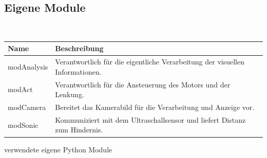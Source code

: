   \subsection{Eigene Module}
  \ \\
  \begin{minipage}{\columnwidth}
    \makeatletter
    \def\@captype{table}
    \makeatother
    \centering
    \begin{tabular}{p{3.5cm}|p{11cm}}
    Name & Beschreibung \\ \hline \hline
    modAnalysis & Verantwortlich für die eigentliche Verarbeitung der visuellen
      Informationen. \\
    modAct & Verantwortlich für die Ansteuerung des Motors und der Lenkung. \\
    modCamera & Bereitet das Kamerabild für die Verarbeitung und Anzeige vor. \\
    modSonic & Kommuniziert mit dem Ultraschallsensor und liefert Distanz zum Hindernis.\\
    \end{tabular}
    \caption{verwendete eigene Python Module}
    \label{tab:sw-02}
  \end{minipage}

